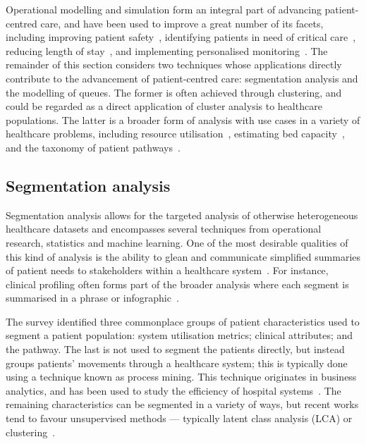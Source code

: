 Operational modelling and simulation form an integral part of advancing
patient-centred care, and have been used to improve a great number of its
facets, including improving patient safety~\cite{Jun2010}, identifying patients
in need of critical care~\cite{Adeyemi2013}, reducing length of
stay~\cite{Gul2012}, and implementing personalised
monitoring~\cite{Velikova2014}. The remainder of this section considers two
techniques whose applications directly contribute to the advancement of
patient-centred care: segmentation analysis and the modelling of queues. The
former is often achieved through clustering, and could be regarded as a direct
application of cluster analysis to healthcare populations. The latter is a
broader form of analysis with use cases in a variety of healthcare problems,
including resource utilisation~\cite{Prokofyeva2020}, estimating bed
capacity~\cite{Williams2015}, and the taxonomy of patient
pathways~\cite{Rojas2016}.


\subsection{Segmentation analysis}

Segmentation analysis allows for the targeted analysis of otherwise
heterogeneous healthcare datasets and encompasses several techniques from
operational research, statistics and machine learning. One of the most desirable
qualities of this kind of analysis is the ability to glean and communicate
simplified summaries of patient needs to stakeholders within a healthcare
system~\cite{ElDarzi2009,Tomar2013,Vuik2016b,Yoon2020}. For instance, clinical
profiling often forms part of the broader analysis where each segment is
summarised in a phrase or infographic~\cite{Vuik2016a,Yan2019}.

The survey identified three commonplace groups of patient characteristics used
to segment a patient population: system utilisation metrics; clinical
attributes; and the pathway. The last is not used to segment the patients
directly, but instead groups patients' movements through a healthcare system;
this is typically done using a technique known as process mining. This technique
originates in business analytics, and has been used to study the efficiency of
hospital systems~\cite{Arnolds2018,Delias2015}. The remaining characteristics
can be segmented in a variety of ways, but recent works tend to favour
unsupervised methods --- typically latent class analysis (LCA) or
clustering~\cite{Yan2018}.

